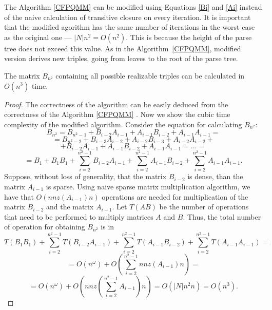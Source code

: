 The Algorithm \ref{CFPQMM} can be modified using Equations \ref{Bi} and \ref{Ai} instead of the naive calculation of transitive closure on every iteration. It is important that the modified agorithm has the same number of iterations in the worst case as the original one --- $|N|n^2 = O(n^2)$. This is because the height of the parse tree does not exceed this value. As in the Algorithm~\ref{CFPQMM}, modified version derives new triples, going from leaves to the root of the parse tree.
\begin{theorem}
The matrix $B_{n^2}$ containing all possible realizable triples can be calculated in $O(n^3)$ time.
\end{theorem}
\begin{proof}
The correctness of the algorithm can be easily deduced from the correctness of the Algorithm \ref{CFPQMM} \cite{Azimov}. Now we show the cubic time complexity of the modified algorithm. Consider the equation for calculating $B_{n^2}$:
$$B_{n^2} = B_{n^2-1} + B_{i-2}A_{i-1} + A_{i-1}B_{i-2} + A_{i-1}A_{i-1} = $$
$$ = B_{n^2-2} + B_{i-3}A_{i-2} + A_{i-2}B_{i-3} + A_{i-2}A_{i-2} +$$ 
$$+ B_{i-2}A_{i-1} + A_{i-1}B_{i-2} + A_{i-1}A_{i-1} = ... =$$
$$= B_1 + B_1B_1 + \sum\limits_{i=2}^{n^2-1}B_{i-2}A_{i-1}+ \sum\limits_{i=2}^{n^2-1}A_{i-1}B_{i-2} + \sum\limits_{i=2}^{n^2-1}A_{i-1}A_{i-1}.$$
Suppose, without loss of generality, that the matrix $B_{i-2}$ is dense, than the matrix $A_{i-1}$ is sparse. Using naive sparse matrix multiplication algorithm, we have that $O(nnz(A_{i-1})n)$ operations are needed for multiplication of the matrix $B_{i-2}$ and the matrix $A_{i-1}$. Let $T(AB)$ be the number of operations that need to be performed to multiply matrices $A$ and $B$. Thus, the total number of operation for obtaining $B_{n^2}$ is in
$$ T(B_1B_1) + \sum\limits_{i=2}^{n^2-1}T(B_{i-2}A_{i-1})+ \sum\limits_{i=2}^{n^2-1}T(A_{i-1}B_{i-2}) + \sum\limits_{i=2}^{n^2-1}T(A_{i-1}A_{i-1})=$$
$$= O(n^{\omega}) +  O(\sum\limits_{i=2}^{n^2-1}nnz(A_{i-1})n) =$$
$$= O(n^{\omega}) + O(nnz(\sum\limits_{i=2}^{n^2-1}A_{i-1})n)  = O(|N|n^2n) = O(n^3).$$
\end{proof}